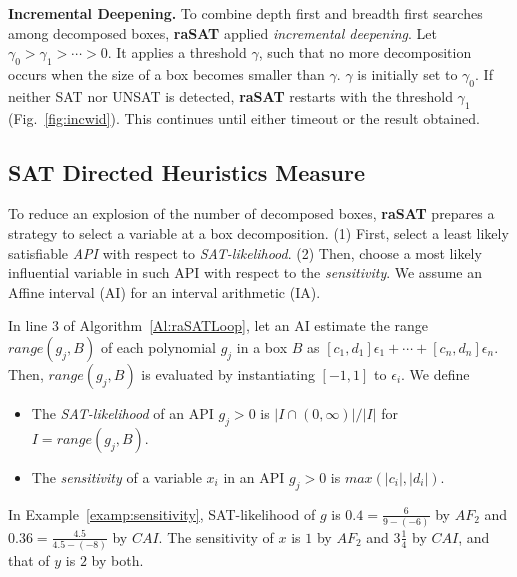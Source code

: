 \documentclass[runningheads,a4paper,oribibl]{llncs}
\newcommand{\suppress}[1]{} %
\begin{document}
\medskip\noindent 
\textbf{Incremental Deepening.}
To combine depth first and breadth first searches among decomposed boxes,
{\bf raSAT} applied {\em incremental deepening}. 
Let $\gamma_0 > \gamma_1 > \cdots > 0$. 
It applies a threshold $\gamma$, such that no more decomposition occurs 
when the size of a box becomes smaller than $\gamma$.
$\gamma$ is initially set to $\gamma_0$. 
If neither SAT nor UNSAT is detected, {\bf raSAT} restarts with the threshold $\gamma_1$
(Fig.~\ref{fig:incwid}). 
This continues until either timeout or the result obtained. 

\subsection{SAT Directed Heuristics Measure} \label{sec:SATheuristics}

\suppress{
With several hundred variables, we observe that an SMT solver works
when either SAT, or UNSAT with small UNSAT core.
%
For the latter, we need an efficient heuristics to find an UNSAT core, which is left as future work. 
For the former, the keys are how to choose variables to decompose, and 
how to choose a box to explore.
}%

To reduce an explosion of the number of decomposed boxes, {\bf raSAT} prepares a strategy
to select a variable at a box decomposition. 
(1) First, select a least likely satisfiable {\em API} with respect to {\em SAT-likelihood}.
(2) Then, choose a most likely influential variable in such API with respect to the 
{\em sensitivity}.
We assume an Affine interval (AI) for an interval arithmetic (IA). 

\sloppy
In line 3 of Algorithm~\ref{Al:raSATLoop},
let an AI estimate the range $range(g_j, B)$ of each polynomial $g_j$ in a box $B$
as ${[c_1,d_1]\epsilon_1 + \cdots + [c_n,d_n]\epsilon_n}$. 
Then, $range(g_j, B)$ is evaluated by instantiating $[-1,1]$ to $\epsilon_i$. 
We define
\begin{itemize} 
\item The {\em SAT-likelihood} of an API $g_j > 0$ is $| I \cap (0,\infty) | / |I|$
  for  $I = range(g_j, B)$. 
\item The {\em sensitivity} of a variable $x_i$ in an API $g_j > 0$ is $max(|c_i|, |d_i|)$. 
\end{itemize} 

\begin{example} \label{examp:SATlikelihood}
  In Example~\ref{examp:sensitivity},
  SAT-likelihood of $g$ is $0.4= \frac{6}{9-(-6)}$ by $AF_2$ 
  and $0.36 = \frac{4.5}{4.5-(-8)}$ by $CAI$.
  The sensitivity of $x$ is $1$ by $AF_2$ and $3\frac{1}{4}$ by $CAI$,
  and that of $y$ is $2$ by both.
\end{example}
\end{document}
